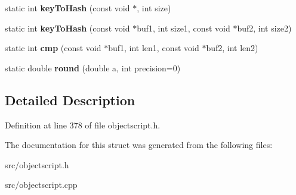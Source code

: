 \begin{DoxyCompactItemize}
\item 
static int {\bfseries key\+To\+Hash} (const void $\ast$, int size)\hypertarget{struct_object_script_1_1_o_s_1_1_utils_aefb273654d76a3e79e01a1bedeebc4f7}{}\label{struct_object_script_1_1_o_s_1_1_utils_aefb273654d76a3e79e01a1bedeebc4f7}

\item 
static int {\bfseries key\+To\+Hash} (const void $\ast$buf1, int size1, const void $\ast$buf2, int size2)\hypertarget{struct_object_script_1_1_o_s_1_1_utils_a0b668d4233f0537ceef64a0352db5a65}{}\label{struct_object_script_1_1_o_s_1_1_utils_a0b668d4233f0537ceef64a0352db5a65}

\item 
static int {\bfseries cmp} (const void $\ast$buf1, int len1, const void $\ast$buf2, int len2)\hypertarget{struct_object_script_1_1_o_s_1_1_utils_af62b202bd06ff4cb00a4b9d6e39c1a3a}{}\label{struct_object_script_1_1_o_s_1_1_utils_af62b202bd06ff4cb00a4b9d6e39c1a3a}

\item 
static double {\bfseries round} (double a, int precision=0)\hypertarget{struct_object_script_1_1_o_s_1_1_utils_a7922c9d97d48f2e38720e21997370698}{}\label{struct_object_script_1_1_o_s_1_1_utils_a7922c9d97d48f2e38720e21997370698}

\end{DoxyCompactItemize}


\subsection{Detailed Description}


Definition at line 378 of file objectscript.\+h.



The documentation for this struct was generated from the following files\+:\begin{DoxyCompactItemize}
\item 
src/objectscript.\+h\item 
src/objectscript.\+cpp\end{DoxyCompactItemize}
